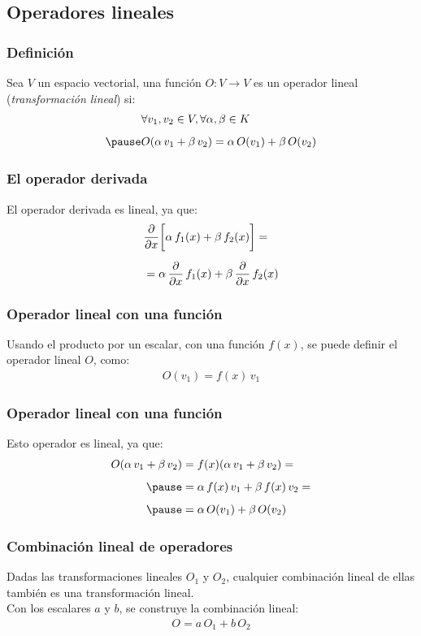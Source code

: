 \documentclass[12pt]{beamer}
\begin{document}
\subsection{Operadores lineales}

\begin{frame}
\frametitle{Definición}
Sea $V$ un espacio vectorial, una función $O:V \to V$ es un operador lineal (\emph{transformación lineal}) si:
\pause
\begin{eqnarray}
\begin{aligned}[b]
&\forall v_{1}, v_{2} \in V, \forall \alpha, \beta \in K  \\[0.5em] \pause
&O(\alpha \, v_{1} + \beta \, v_{2}) = \alpha \, O(v_{1}) + \beta \, O(v_{2})
\end{aligned}
\label{eq:ecuacion_06_116}
\end{eqnarray}
\end{frame}
\begin{frame}
\frametitle{El operador derivada}
El operador derivada es lineal, ya que:
\pause
\begin{align*}
&\pdv{x} \bigg[ \alpha \, f_{1}(x) + \beta \, f_{2}(x) \bigg] = \\[0.5em]
&= \alpha \, \pdv{x} \, f_{1}(x) + \beta \, \pdv{x} \, f_{2}(x)
\end{align*}
\end{frame}
\begin{frame}
\frametitle{Operador lineal con una función}
Usando el producto por un escalar, con una función $f(x)$, se puede definir el operador lineal $O$, como:
\pause
\begin{align*}
O(v_{1}) = f(x) \, v_{1}
\end{align*}
\end{frame}
\begin{frame}
\frametitle{Operador lineal con una función}
Esto operador es lineal, ya que:
\pause
\begin{eqnarray*}
\begin{aligned}
O(\alpha \, v_{1} + \beta \, v_{2}) &= f(x) (\alpha \, v_{1} + \beta \, v_{2}) = \\[0.5em] \pause
&= \alpha \, f(x) \, v_{1} + \beta \, f(x) \, v_{2} = \\[0.5em] \pause
&= \alpha \, O(v_{1}) + \beta \, O(v_{2})
\end{aligned}
\end{eqnarray*}
\end{frame}
\begin{frame}
\frametitle{Combinación lineal de operadores}
Dadas las transformaciones lineales $O_{1}$ y $O_{2}$, cualquier combinación lineal de ellas también es una transformación lineal.
\\
\bigskip
\pause
Con los escalares $a$ y $b$, se construye la combinación lineal:
\begin{align*}
O = a \, O_{1} + b \, O_{2}
\end{align*}
\end{frame}
\end{document}

